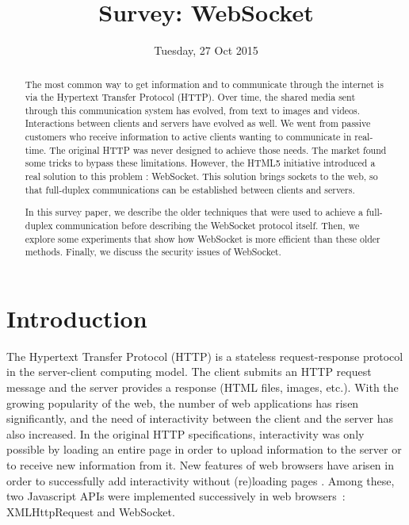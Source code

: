 \documentclass[10pt,journal,compsoc]{IEEEtran}
\newcommand{\ws}{WebSocket}
\begin{document}
\author{}

\title{Survey: \ws }

\date{Tuesday, 27 Oct 2015}


\maketitle
\IEEEpeerreviewmaketitle



\begin{abstract}
The most common way to get information and to communicate through the internet is via the Hypertext Transfer Protocol (HTTP).
Over time, the shared media sent through this communication system has evolved, from text to images and videos.
Interactions between clients and servers have evolved as well.
We went from passive customers who receive information to active clients wanting to communicate in real-time.
The original HTTP was never designed to achieve those needs.
The market found some tricks to bypass these limitations.
However, the HTML5 initiative introduced a real solution to this problem : \ws{}.
This solution brings sockets to the web, so that full-duplex communications can be established between clients and servers.

In this survey paper, we describe the older techniques that were used to achieve a full-duplex communication before describing the \ws{} protocol itself.
Then, we explore some experiments that show how \ws{} is more efficient than these older methods.
Finally, we discuss the security issues of \ws{}.
\end{abstract}


\section{Introduction}

The Hypertext Transfer Protocol (HTTP) is a stateless request-response protocol in the server-client computing model.
The client submits an HTTP request message and the server provides a response (HTML files, images, etc.).
With the growing popularity of the web, the number of web applications has risen significantly, and the need of interactivity between the client and the server has also increased. %
In the original HTTP specifications, interactivity was only possible by loading an entire page in order to upload information to the server or to receive new information from it. %
New features of web browsers have arisen in order to successfully add interactivity without (re)loading pages \cite{RealTimeMonitoringUsingAJAXAndWebSockets}.
Among these, two Javascript APIs were implemented successively in web \mbox{browsers :} XML\-Http\-Request and \ws. %
\end{document}
